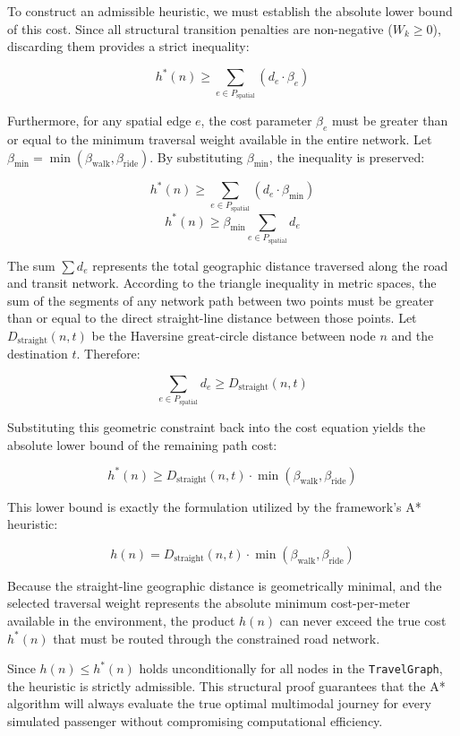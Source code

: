 {{To construct an admissible heuristic, we must establish the absolute lower bound of this cost. Since all structural transition penalties are non-negative ($W_k \ge 0$), discarding them provides a strict inequality:

$$h^*(n) \geq \sum_{e \in P_{\mathrm{spatial}}} (d_e \cdot \beta_e)$$

Furthermore, for any spatial edge $e$, the cost parameter $\beta_e$ must be greater than or equal to the minimum traversal weight available in the entire network. Let $\beta_{\mathrm{min}} = \min(\beta_{\mathrm{walk}}, \beta_{\mathrm{ride}})$. By substituting $\beta_{\mathrm{min}}$, the inequality is preserved:

$$h^*(n) \geq \sum_{e \in P_{\mathrm{spatial}}} (d_e \cdot \beta_{\mathrm{min}})$$
$$h^*(n) \geq \beta_{\mathrm{min}} \sum_{e \in P_{\mathrm{spatial}}} d_e$$

The sum $\sum d_e$ represents the total geographic distance traversed along the road and transit network. According to the triangle inequality in metric spaces, the sum of the segments of any network path between two points must be greater than or equal to the direct straight-line distance between those points. Let $D_{\mathrm{straight}}(n, t)$ be the Haversine great-circle distance between node $n$ and the destination $t$. Therefore:

$$\sum_{e \in P_{\mathrm{spatial}}} d_e \geq D_{\mathrm{straight}}(n, t)$$

Substituting this geometric constraint back into the cost equation yields the absolute lower bound of the remaining path cost:

$$h^*(n) \geq D_{\mathrm{straight}}(n, t) \cdot \min(\beta_{\mathrm{walk}}, \beta_{\mathrm{ride}})$$

This lower bound is exactly the formulation utilized by the framework's A* heuristic:

$$h(n) = D_{\mathrm{straight}}(n, t) \cdot \min(\beta_{\mathrm{walk}}, \beta_{\mathrm{ride}})$$

Because the straight-line geographic distance is geometrically minimal, and the selected traversal weight represents the absolute minimum cost-per-meter available in the environment, the product $h(n)$ can never exceed the true cost $h^*(n)$ that must be routed through the constrained road network. 

Since $h(n) \leq h^*(n)$ holds unconditionally for all nodes in the \texttt{TravelGraph}, the heuristic is strictly admissible. This structural proof guarantees that the A* algorithm will always evaluate the true optimal multimodal journey for every simulated passenger without compromising computational efficiency.

}}
